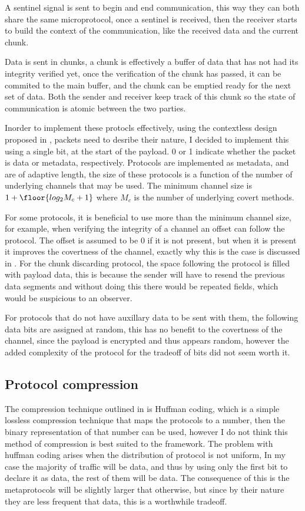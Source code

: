 A sentinel signal is sent to begin and end communication, this way they can both share the same microprotocol, once a sentinel is received, then the receiver starts to build the context of the communication, like the received data and the current chunk.

Data is sent in chunks, a chunk is effectively a buffer of data that has not had its integrity verified yet, once the verification of the chunk has passed, it can be commited to the main buffer, and the chunk can be emptied ready for the next set of data. Both the sender and receiver keep track of this chunk so the state of communication is atomic between the two parties.

Inorder to implement these protocls effectively, using the contextless design proposed in , packets need to desribe their nature, I decided to implement this using a single bit, at the start of the payload. 0 or 1 indicate whether the packet is data or metadata, respectively. Protocols are implemented as metadata, and are of adaptive length, the size of these protocols is a function of the number of underlying channels that may be used. The minimum channel size is $1 + \floor{log_2{M_c + 1}}$ where $M_c$ is the number of underlying covert methods.

For some protocols, it is beneficial to use more than the minimum channel size, for example, when verifying the integrity of a channel an offset can follow the protocol. The offset is assumed to be 0 if it is not present, but when it is present it improves the covertness of the channel, exactly why this is the case is discussed in . For the chunk discarding protocol, the space following the protocol is filled with payload data, this is because the sender will have to resend the previous data segments and without doing this there would be repeated fields, which would be suspicious to an observer.

For protocols that do not have auxillary data to be sent with them, the following data bits are assigned at random, this has no benefit to the covertness of the channel, since the payload is encrypted and thus appears random, however the added complexity of the protocol for the tradeoff of bits did not seem worth it.


\subsection{Protocol compression}

The compression technique outlined in  is Huffman coding, which is a simple lossless compression technique that maps the protocols to a number, then the binary representation of that number can be used, however I do not think this method of compression is best suited to the framework. The problem with huffman coding arises when the distribution of protocol is not uniform, In my case the majority of traffic will be data, and thus by using only the first bit to declare it as data, the rest of them will be data. The consequence of this is the metaprotocols will be slightly larger that otherwise, but since by their nature they are less frequent that data, this is a worthwhile tradeoff.

